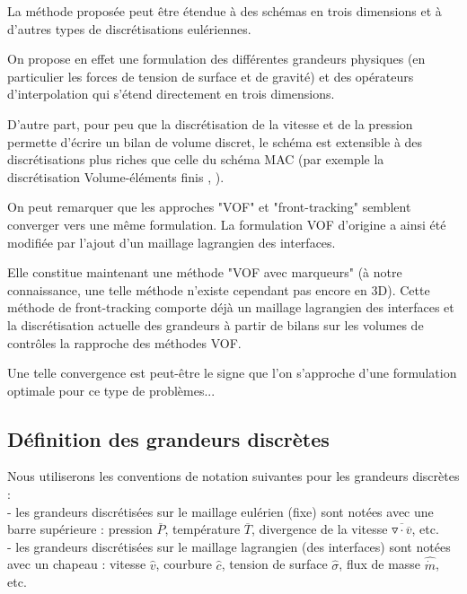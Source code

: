 La m\'ethode propos\'ee peut \^etre \'etendue \`a des sch\'emas en trois dimensions
et \`a d'autres types de discr\'etisations eul\'eriennes.

On propose en effet une formulation des diff\'erentes grandeurs physiques
(en particulier les forces de tension de surface et de gravit\'e)
et des op\'erateurs d'interpolation qui s'\'etend directement en trois dimensions.

D'autre part, pour peu que la discr\'etisation de la vitesse et de la pression permette d'\'ecrire
un bilan de volume discret, le sch\'ema est extensible à des discr\'etisations plus riches que celle
du sch\'ema MAC (par exemple la discr\'etisation Volume-\'el\'ements finis \cite{Emonot2003}, \cite{Heib2003}).

On peut remarquer que les approches "VOF" et "front-tracking" semblent converger vers une m\^eme formulation.
La formulation VOF d'origine a ainsi \'et\'e modifi\'ee \cite{Popinet2000} par
l'ajout d'un maillage lagrangien des interfaces.

Elle constitue maintenant une m\'ethode "VOF avec marqueurs"
(\`a notre connaissance, une telle m\'ethode n'existe cependant pas encore en 3D).
Cette m\'ethode de front-tracking comporte d\'ej\`a un maillage lagrangien des interfaces
et la discr\'etisation actuelle des grandeurs à partir de bilans sur les volumes de contr\^oles la rapproche des
m\'ethodes VOF.

Une telle convergence est peut-\^etre le signe que l'on s'approche
d'une formulation optimale pour ce type de probl\`emes...


\subsection{D\'efinition des grandeurs discr\`etes}
Nous utiliserons les conventions de notation suivantes pour les grandeurs discr\`etes :\\
- les grandeurs discr\'etis\'ees sur le maillage eul\'erien (fixe) sont not\'ees avec une barre sup\'erieure : pression $\overline{P}$, temp\'erature $\overline{T}$, divergence de la vitesse $\overline{\triangledown \cdot \overline{v}}$, etc.\\
- les grandeurs discr\'etis\'ees sur le maillage lagrangien (des interfaces) sont
not\'ees avec un chapeau : vitesse $\hat{v}$, courbure $\hat{c}$, tension de surface $\hat{\sigma}$, flux de masse $\hat{\dot{m}}$, etc.

